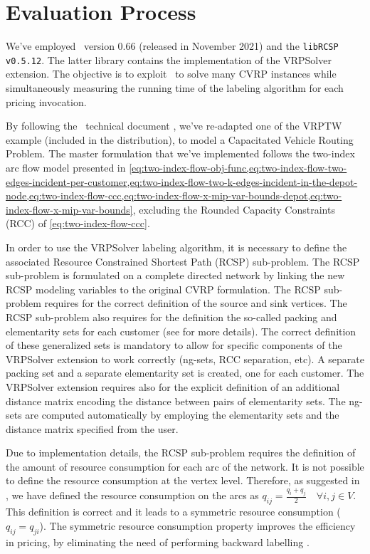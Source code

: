 \section{Evaluation Process}
\label{sec:results-evaluation-process}

We've employed \bapcod\ version 0.66 (released in November 2021) and the \texttt{libRCSP v0.5.12}.
The latter library contains the implementation of the VRPSolver extension.
The objective is to exploit \bapcod\ to solve many CVRP instances while simultaneously
measuring the running time of the labeling algorithm for each pricing invocation.

\medskip

By following the \bapcod\ technical document \parencite{sadykov2021},
we've re-adapted one of the VRPTW example (included in the distribution),
to model a Capacitated Vehicle Routing Problem.
The master formulation that we've implemented follows the two-index arc flow model
presented in \cref{eq:two-index-flow-obj-func,eq:two-index-flow-two-edges-incident-per-customer,eq:two-index-flow-two-k-edges-incident-in-the-depot-node,eq:two-index-flow-ccc,eq:two-index-flow-x-mip-var-bounds-depot,eq:two-index-flow-x-mip-var-bounds},
excluding the Rounded Capacity Constraints (RCC) of \cref{eq:two-index-flow-ccc}.

In order to use the VRPSolver labeling algorithm, it is necessary
to define the associated Resource Constrained Shortest Path (RCSP) sub-problem.
The RCSP sub-problem is formulated on a complete directed network by
linking the new RCSP modeling variables to the original CVRP formulation.
The RCSP sub-problem requires for the correct definition of the source and sink
vertices.
The RCSP sub-problem also requires for the definition the so-called packing and elementarity
sets for each customer (see \cite{pessoa2020a} for more details).
The correct definition of these generalized sets is mandatory to allow for specific
components of the VRPSolver extension to work correctly (ng-sets, RCC separation, etc).
A separate packing set and a separate elementarity set is created, one for each customer.
The VRPSolver extension requires also for the explicit definition of an additional
distance matrix encoding the distance between pairs of elementarity sets.
The ng-sets are computed automatically by employing the elementarity sets
and the distance matrix specified from the user.

Due to implementation details, the RCSP sub-problem requires
the definition of the amount of resource consumption for each arc of the network.
It is not possible to define the resource consumption at the vertex level.
Therefore, as suggested in \textcite{pessoa2020a}, we have defined the resource consumption
on the arcs as $q_{ij} = \frac{q_{i} + q_{j}}{2} \quad \forall i, j \in V$.
This definition is correct and it leads to a symmetric resource consumption ($q_{ij} = q_{ji}$).
The symmetric resource consumption property improves the efficiency in pricing,
by eliminating the need of performing backward labelling \parencite{pessoa2020a}.

